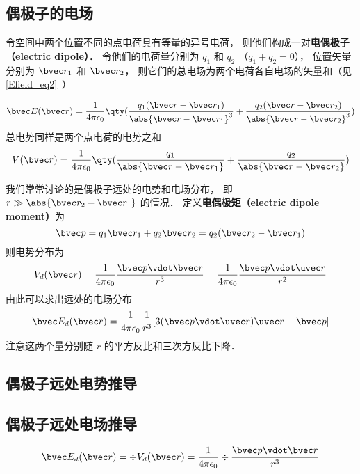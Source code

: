 


\subsection{偶极子的电场}

令空间中两个位置不同的点电荷具有等量的异号电荷， 则他们构成一对\textbf{电偶极子（electric dipole）}． 令他们的电荷量分别为 $q_1$ 和 $q_2$ （$q_1 + q_2 = 0$）， 位置矢量分别为 $\bvec r_1$ 和 $\bvec r_2$， 则它们的总电场为两个电荷各自电场的矢量和（见\autoref{Efield_eq2}~）

\begin{equation}
\bvec E(\bvec r) = \frac{1}{4\pi\epsilon_0} \qty(\frac{q_1(\bvec r - \bvec r_1)}{\abs{\bvec r - \bvec r_1}^3} + \frac{q_2(\bvec r - \bvec r_2)}{\abs{\bvec r - \bvec r_2}^3})
\end{equation}
总电势同样是两个点电荷的电势之和%
\begin{equation}
V(\bvec r) = \frac{1}{4\pi\epsilon_0} \qty(\frac{q_1}{\abs{\bvec r - \bvec r_1}} + \frac{q_2}{\abs{\bvec r - \bvec r_2}})
\end{equation}

我们常常讨论的是偶极子远处的电势和电场分布， 即 $r \gg \abs{\bvec r_2 - \bvec r_1}$ 的情况． 定义\textbf{电偶极矩（electric dipole moment）}为
\begin{equation}\label{eleDpl_eq1}
\bvec p = q_1 \bvec r_1 + q_2 \bvec r_2 = q_2 (\bvec r_2 - \bvec r_1)
\end{equation}
则电势分布为
\begin{equation}
V_d(\bvec r) = \frac{1}{4\pi\epsilon_0} \frac{\bvec p\vdot \bvec r}{r^3} = \frac{1}{4\pi\epsilon_0} \frac{\bvec p \vdot \uvec r}{r^2}
\end{equation}
由此可以求出远处的电场分布
\begin{equation}
\bvec E_d(\bvec r) = \frac{1}{4\pi\epsilon_0} \frac{1}{r^3} [3(\bvec p \vdot \uvec r) \uvec r - \bvec p]
\end{equation}
注意这两个量分别随 $r$ 的平方反比和三次方反比下降．

\subsection{偶极子远处电势推导}

\subsection{偶极子远处电场推导}

\begin{equation}
\bvec E_d(\bvec r) = \div V_d(\bvec r) = \frac{1}{4\pi\epsilon_0} \div  \frac{\bvec p\vdot \bvec r}{r^3}
\end{equation}
